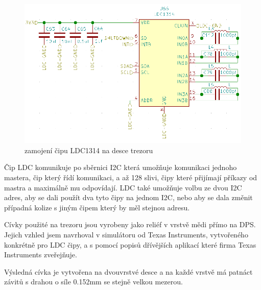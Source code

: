 \begin{figure}[htbp]
    \centering
    \includegraphics[width=\textwidth]{kapitoly/obrazky/E4/elektronika_tlakove_desky/moje_zapojeni.png}
    \caption{zamojení čipu LDC1314 na desce trezoru}
    \label{fig:M1}
\end{figure}

Čip LDC komunikuje po sběrnici I2C která umožňuje komunikaci jednoho mastera, čip který řídí komunikaci, a až 128 slivi, čipy které přijímají příkazy
od mastra a maximálně mu odpovídají. LDC také umožňuje volbu ze dvou I2C adres, aby se dali použít dva tyto čipy na jednom I2C, nebo aby se dala změnit 
případná kolize s jiným čipem který by měl stejnou adresu.

\newpage

Cívky použité na trezoru jsou vyrobeny jako reliéf v vrstvě mědi přímo na DPS. Jejich vzhled jsem navrhoval v simulátoru od Texas Instruments, 
vytvořeného konkrétně pro LDC čipy, a s pomocí popisů dřívějších aplikací které firma Texas Instruments zveřejňuje.


Výsledná cívka je vytvořena na dvouvrstvé desce a na každé vrstvě má patnáct závitů s drahou o síle 0.152mm se stejně velkou mezerou.

